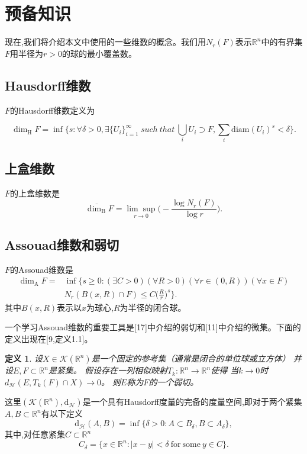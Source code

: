 \documentclass[12pt,a4paper]{article}
\newtheorem{definition}[theorem]{定义}
\newcommand{\Hdim}{\mathrm{\dim_H}}
\newcommand{\Adim}{\mathrm{\dim_A}}
\newcommand{\Bdim}{\mathrm{\dim_B}}
\newcommand{\diam}{\mathrm{diam}}
\newcommand{\Hd}{\mathrm{d}_\mathcal{H}}
\begin{document}
      \section{预备知识}
      现在,我们将介绍本文中使用的一些维数的概念。我们用$N_r(F)$表示$\mathbb{R}^n$中的有界集$F$用半径为$r>0$的球的最小覆盖数。

      \subsection{Hausdorff维数}
      $F$的Hausdorff维数定义为

      $$
            \Hdim F=\inf\{s:\forall\delta>0,\exists\{U_i\}_{i=1}^\infty ~such~that~ \bigcup_iU_i\supset F, \sum_i \diam(U_i)^s<\delta\}.
      $$

      \subsection{上盒维数}
      $F$的上盒维数是
      $$
            \overline{\Bdim}F=\underset{r\rightarrow0}{\lim \sup}\big(-\frac{\log N_r(F)}{\log r}\big).
      $$
      \subsection{Assouad维数和弱切}
      $F$的Assouad维数是
      $$
      \begin{aligned}
            \Adim F=&\inf\{s\ge0:(\exists C>0)(\forall R>0)(\forall r\in(0,R))(\forall x\in F)\\
            &N_r(B(x,R)\cap F)\le C\Big(\frac{R}{r}\Big)^s\}.
      \end{aligned}
      $$
      其中$B(x,R)$表示以$x$为球心,$R$为半径的闭合球。

      一个学习Assouad维数的重要工具是[17]中介绍的弱切和[11]中介绍的微集。下面的定义出现在[9,定义1.1]。

      \begin{definition}
            设$X\in\mathcal{K}(\mathbb{R}^n)$是一个固定的参考集（通常是闭合的单位球或立方体）
            并设$E,F\subset\mathbb{R}^n$是紧集。
            假设存在一列相似映射$T_k:\mathbb{R}^n\rightarrow\mathbb{R}^n$使得
            当$k\rightarrow0$时$d_\mathcal{H}(E,T_k(F)\cap X)\rightarrow0$。
            则$E$称为$F$的一个弱切。
      \end{definition}

      这里$(\mathcal{K}(\mathbb{R}^n),\mathrm{d}_\mathcal{H})$是一个具有Hausdorff度量的完备的度量空间,即对于两个紧集
      $A,B\subset\mathbb{R}^n$有以下定义
      $$
            \Hd(A,B)=\inf\{\delta>0:A\subset B_\delta,B\subset A_\delta\},
      $$
      其中,对任意紧集$C\subset\mathbb{R}^n$
      $$
            C_\delta=\{x\in\mathbb{R}^n:|x-y|<\delta ~\mathrm{for~some}~ y\in C\}.
      $$
\end{document}
